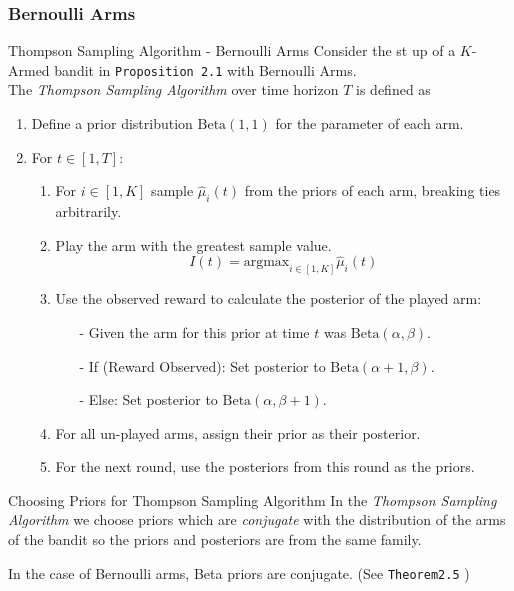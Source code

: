 \documentclass[11pt,a4paper]{article}
\begin{document}
\subsubsection*{Bernoulli Arms}

  \begin{definition}{Thompson Sampling Algorithm - Bernoulli Arms}
    Consider the st up of a $K$-Armed bandit in \texttt{Proposition 2.1} with Bernoulli Arms.\\
    The \textit{Thompson Sampling Algorithm} over time horizon $T$ is defined as
    \begin{enumerate}
      \item Define a prior distribution $\text{Beta}(1,1)$ for the parameter of each arm.
      \item For $t\in[1,T]$:
      \begin{enumerate}
        \item For $i\in[1,K]$ sample $\hat\mu_i(t)$ from the priors of each arm, breaking ties arbitrarily.
        \item Play the arm with the greatest sample value.
        \[ I(t)=\text{argmax}_{i\in[1,K]}\hat\mu_i(t) \]
        \item Use the observed reward to calculate the posterior of the played arm:
        \begin{itemize}
          \item[-] Given the arm for this prior at time $t$ was $\text{Beta}(\alpha,\beta)$.
          \item[-] If (Reward Observed): Set posterior to $\text{Beta}(\alpha+1,\beta)$.
          \item[-] Else: Set posterior to $\text{Beta}(\alpha,\beta+1)$.
        \end{itemize}
        \item For all un-played arms, assign their prior as their posterior.
        \item For the next round, use the posteriors from this round as the priors.
      \end{enumerate}
    \end{enumerate}
  \end{definition}

  \begin{remark}{Choosing Priors for Thompson Sampling Algorithm}
    In the \textit{Thompson Sampling Algorithm} we choose priors which are \textit{conjugate} with the distribution of the arms of the bandit so the priors and posteriors are from the same family.
    \par In the case of Bernoulli arms, Beta priors are conjugate. (See \texttt{Theorem2.5} )
  \end{remark}
\end{document}
